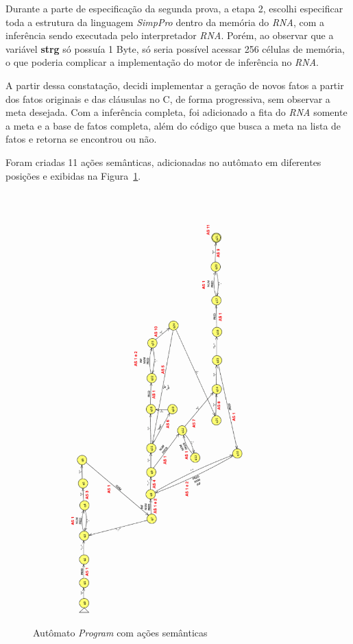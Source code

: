 
Durante a parte de especificação da segunda prova, a etapa 2, escolhi especificar toda a estrutura da linguagem \emph{SimpPro} dentro da memória do \emph{RNA}, com a inferência sendo executada pelo interpretador \emph{RNA}. Porém, ao observar que a variável \textbf{strg} só possuía 1 Byte, só seria possível acessar 256 células de memória, o que poderia complicar a implementação do motor de inferência no \emph{RNA}.

A partir dessa constatação, decidi implementar a geração de novos fatos a partir dos fatos originais e das cláusulas no C, de forma progressiva, sem observar a meta desejada. Com a inferência completa, foi adicionado a fita do \emph{RNA} somente a meta e a base de fatos completa, além do código que busca a meta na lista de fatos e retorna se encontrou ou não.

Foram criadas 11 ações semânticas, adicionadas no autômato em diferentes posições e exibidas na Figura~\ref{fig:semantico}.

\begin{figure}[htbp]
    \centering
    \includegraphics[width=0.75\textwidth]{./images/semantico.png}
    \caption{Autômato \emph{Program} com ações semânticas}
    \label{fig:semantico}
\end{figure}

